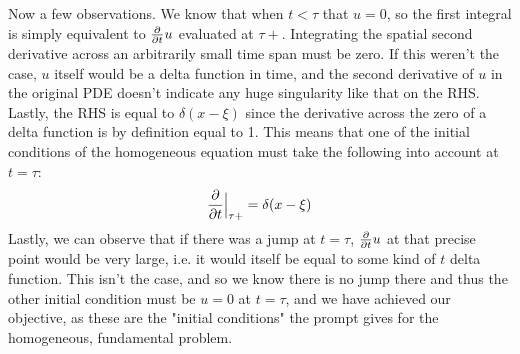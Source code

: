 \documentclass{article}
\begin{document}
Now a few observations. We know that when $t<\tau$ that $u=0$, so the first integral is simply equivalent to $\pdv{}{t}u$ evaluated at $\tau+$. Integrating the spatial second derivative across an arbitrarily small time span must be zero. If this weren't the case, $u$ itself would be a delta function in time, and the second derivative of $u$ in the original PDE doesn't indicate any huge singularity like that on the RHS. Lastly, the RHS is equal to $\delta(x-\xi)$ since the derivative across the zero of a delta function is by definition equal to 1. This means that one of the initial conditions of the homogeneous equation must take the following into account at $t=\tau$:
\begin{equation}
\begin{aligned}
\pdv{}{t} \Big{|}_{\tau +} = \delta(x-\xi)
\end{aligned}
\end{equation}
Lastly, we can observe that if there was a jump at $t=\tau$, $\pdv{}{t}u$ at that precise point would be very large, i.e. it would itself be equal to some kind of $t$ delta function. This isn't the case, and so we know there is no jump there and thus the other initial condition must be $u=0$ at $t=\tau$, and we have achieved our objective, as these are the "initial conditions" the prompt gives for the homogeneous, fundamental problem.
\end{document}
